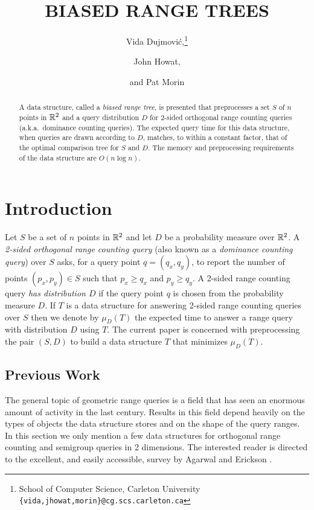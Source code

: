 \documentclass{patmorin}
\title{\MakeUppercase{Biased Range Trees}}
\author{Vida Dujmovi\'c,\thanks{School of Computer Science,
	Carleton University \texttt{\{vida,jhowat,morin\}@cg.scs.carleton.ca}}
	\and John Howat,\footnotemark[1] \and and
	Pat Morin\footnotemark[1]}
\date{}
\begin{document}
\maketitle
\begin{abstract}
A data structure, called a \emph{biased range tree}, is presented that
preprocesses a set $S$ of $n$ points in $\mathbb{R}^2$ and a query distribution
$D$ for 2-sided orthogonal range counting queries (a.k.a.\ dominance
counting queries).  The expected query time for this data structure,
when queries are drawn according to $D$, matches, to within a constant
factor, that of the optimal comparison tree for $S$ and $D$.   The memory
and preprocessing requirements of the data structure are $O(n\log n)$.
\end{abstract}

\section{Introduction}

Let $S$ be a set of $n$ points in $\mathbb{R}^2$ and let $D$ be a probability
measure over $\mathbb{R}^2$.  A \emph{2-sided orthogonal range counting query}
(also known as a \emph{dominance counting query}) over $S$ asks, for a
query point $q=(q_x,q_y)$, to report the number of points $(p_x,p_y)\in
S$ such that $p_x \ge q_x$ and $p_y \ge q_y$.  A 2-sided range counting
query \emph{has distribution $D$} if the query point $q$ is chosen from
the probability measure $D$.  If $T$ is a data structure for answering
2-sided range counting queries over $S$ then we denote by $\mu_D(T)$ the
expected time to answer a range query with distribution $D$ using $T$.
The current paper is concerned with preprocessing the pair $(S,D)$
to build a data structure $T$ that minimizes $\mu_D(T)$.

\subsection{Previous Work}

The general topic of geometric range queries is a field that has seen
an enormous amount of activity in the last century.  Results in this
field depend heavily on the types of objects the data structure stores
and on the shape of the query ranges.  In this section we only mention
a few data structures for orthogonal range counting and semigroup
queries in 2 dimensions.  The interested reader is directed to the
excellent, and easily accessible, survey by Agarwal and Erickson
\cite{ae99}.
\end{document}
